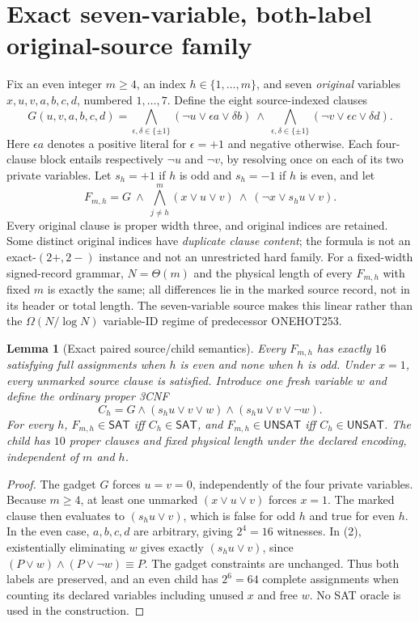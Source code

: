 \documentclass[11pt]{article}
\newtheorem{lemma}[theorem]{Lemma}
\newcommand{\SAT}{\mathsf{SAT}}
\newcommand{\UNSAT}{\mathsf{UNSAT}}
\begin{document}
\section{Exact seven-variable, both-label original-source family}
Fix an even integer $m\ge4$, an index $h\in\{1,\ldots,m\}$, and seven \emph{original} variables $x,u,v,a,b,c,d$, numbered $1,\ldots,7$. Define the eight source-indexed clauses
\[
G(u,v,a,b,c,d)=\bigwedge_{\epsilon,\delta\in\{\pm1\}}
(\neg u\vee\epsilon a\vee\delta b)
\ \wedge\
\bigwedge_{\epsilon,\delta\in\{\pm1\}}
(\neg v\vee\epsilon c\vee\delta d).
\]
Here $\epsilon a$ denotes a positive literal for $\epsilon=+1$ and negative otherwise. Each four-clause block entails respectively $\neg u$ and $\neg v$, by resolving once on each of its two private variables. Let $s_h=+1$ if $h$ is odd and $s_h=-1$ if $h$ is even, and let
\[
F_{m,h}=G\ \wedge\
\bigwedge_{j\ne h}^{m}(x\vee u\vee v)\
\wedge\
(\neg x\vee s_hu\vee v).
\tag{1}
\]
Every original clause is proper width three, and original indices are retained. Some distinct original indices have \emph{duplicate clause content}; the formula is not an exact-$(2+,2-)$ instance and not an unrestricted hard family. For a fixed-width signed-record grammar, $N=\Theta(m)$ and the physical length of every $F_{m,h}$ with fixed $m$ is exactly the same; all differences lie in the marked source record, not in its header or total length. The seven-variable source makes this linear rather than the $\Omega(N/\log N)$ variable-ID regime of predecessor ONEHOT253.

\begin{lemma}[Exact paired source/child semantics]
Every $F_{m,h}$ has exactly $16$ satisfying full assignments when $h$ is even and none when $h$ is odd. Under $x=1$, every unmarked source clause is satisfied. Introduce one fresh variable $w$ and define the ordinary proper 3CNF
\[
C_h=G\land(s_hu\vee v\vee w)\land(s_hu\vee v\vee\neg w).
\tag{2}
\]
For every $h$, $F_{m,h}\in\SAT$ iff $C_h\in\SAT$, and
$F_{m,h}\in\UNSAT$ iff $C_h\in\UNSAT$. The child has $10$ proper clauses and fixed physical length under the declared encoding, independent of $m$ and $h$.
\end{lemma}
\begin{proof}
The gadget $G$ forces $u=v=0$, independently of the four private variables. Because $m\ge4$, at least one unmarked $(x\vee u\vee v)$ forces $x=1$. The marked clause then evaluates to $(s_hu\vee v)$, which is false for odd $h$ and true for even $h$. In the even case, $a,b,c,d$ are arbitrary, giving $2^4=16$ witnesses. In (2), existentially eliminating $w$ gives exactly $(s_hu\vee v)$, since $(P\vee w)\land(P\vee\neg w)\equiv P$. The gadget constraints are unchanged. Thus both labels are preserved, and an even child has $2^6=64$ complete assignments when counting its declared variables including unused $x$ and free $w$. No SAT oracle is used in the construction.
\end{proof}
\end{document}
